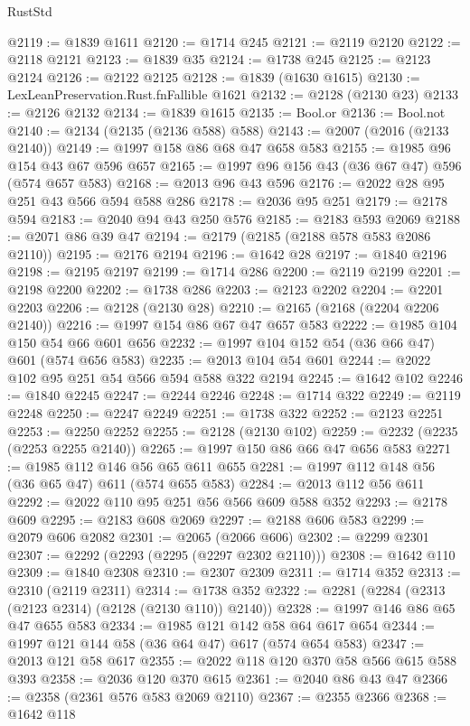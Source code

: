 \begin{lexlean}{RustStd}
\begin{coremodule}
@2119 := @1839 @1611
@2120 := @1714 @245
@2121 := @2119 @2120
@2122 := @2118 @2121
@2123 := @1839 @35
@2124 := @1738 @245
@2125 := @2123 @2124
@2126 := @2122 @2125
@2128 := @1839 (@1630 @1615)
@2130 := LexLeanPreservation.Rust.fnFallible @1621
@2132 := @2128 (@2130 @23)
@2133 := @2126 @2132
@2134 := @1839 @1615
@2135 := Bool.or
@2136 := Bool.not
@2140 := @2134 (@2135 (@2136 @588) @588)
@2143 := @2007 (@2016 (@2133 @2140))
@2149 := @1997 @158 @86 @68 @47 @658 @583
@2155 := @1985 @96 @154 @43 @67 @596 @657
@2165 := @1997 @96 @156 @43 (@36 @67 @47) @596 (@574 @657 @583)
@2168 := @2013 @96 @43 @596
@2176 := @2022 @28 @95 @251 @43 @566 @594 @588 @286
@2178 := @2036 @95 @251
@2179 := @2178 @594
@2183 := @2040 @94 @43 @250 @576
@2185 := @2183 @593 @2069
@2188 := @2071 @86 @39 @47
@2194 := @2179 (@2185 (@2188 @578 @583 @2086 @2110))
@2195 := @2176 @2194
@2196 := @1642 @28
@2197 := @1840 @2196
@2198 := @2195 @2197
@2199 := @1714 @286
@2200 := @2119 @2199
@2201 := @2198 @2200
@2202 := @1738 @286
@2203 := @2123 @2202
@2204 := @2201 @2203
@2206 := @2128 (@2130 @28)
@2210 := @2165 (@2168 (@2204 @2206 @2140))
@2216 := @1997 @154 @86 @67 @47 @657 @583
@2222 := @1985 @104 @150 @54 @66 @601 @656
@2232 := @1997 @104 @152 @54 (@36 @66 @47) @601 (@574 @656 @583)
@2235 := @2013 @104 @54 @601
@2244 := @2022 @102 @95 @251 @54 @566 @594 @588 @322 @2194
@2245 := @1642 @102
@2246 := @1840 @2245
@2247 := @2244 @2246
@2248 := @1714 @322
@2249 := @2119 @2248
@2250 := @2247 @2249
@2251 := @1738 @322
@2252 := @2123 @2251
@2253 := @2250 @2252
@2255 := @2128 (@2130 @102)
@2259 := @2232 (@2235 (@2253 @2255 @2140))
@2265 := @1997 @150 @86 @66 @47 @656 @583
@2271 := @1985 @112 @146 @56 @65 @611 @655
@2281 := @1997 @112 @148 @56 (@36 @65 @47) @611 (@574 @655 @583)
@2284 := @2013 @112 @56 @611
@2292 := @2022 @110 @95 @251 @56 @566 @609 @588 @352
@2293 := @2178 @609
@2295 := @2183 @608 @2069
@2297 := @2188 @606 @583
@2299 := @2079 @606 @2082
@2301 := @2065 (@2066 @606)
@2302 := @2299 @2301
@2307 := @2292 (@2293 (@2295 (@2297 @2302 @2110)))
@2308 := @1642 @110
@2309 := @1840 @2308
@2310 := @2307 @2309
@2311 := @1714 @352
@2313 := @2310 (@2119 @2311)
@2314 := @1738 @352
@2322 := @2281 (@2284 (@2313 (@2123 @2314) (@2128 (@2130 @110)) @2140))
@2328 := @1997 @146 @86 @65 @47 @655 @583
@2334 := @1985 @121 @142 @58 @64 @617 @654
@2344 := @1997 @121 @144 @58 (@36 @64 @47) @617 (@574 @654 @583)
@2347 := @2013 @121 @58 @617
@2355 := @2022 @118 @120 @370 @58 @566 @615 @588 @393
@2358 := @2036 @120 @370 @615
@2361 := @2040 @86 @43 @47
@2366 := @2358 (@2361 @576 @583 @2069 @2110)
@2367 := @2355 @2366
@2368 := @1642 @118

\end{coremodule}
\end{lexlean}
